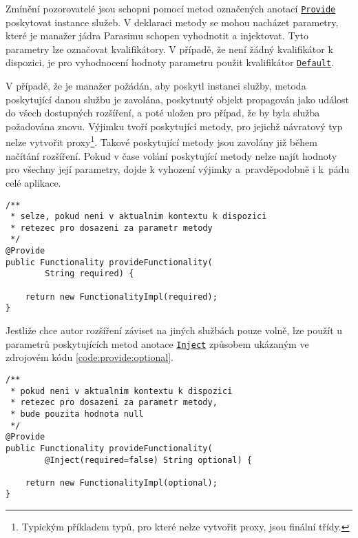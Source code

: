 Zmínění pozorovatelé jsou schopni pomocí metod označených anotací \href{https://github.com/sybila/parasim/blob/2.0.0.Final/core/src/main/java/org/sybila/parasim/core/annotation/Provide.java}{\texttt{Provide}}
poskytovat instance služeb. V deklaraci metody se mohou na\-chá\-zet parametry,
které je manažer jádra Parasimu schopen vyhodnotit a injektovat. Tyto parametry
lze označovat kvalifikátory. V případě, že není žádný kvalifikátor k dispozici,
je pro vyhodnocení hodnoty parametru použit kvalifikátor \href{https://github.com/sybila/parasim/blob/2.0.0.Final/core/src/main/java/org/sybila/parasim/core/annotation/Default.java}{\texttt{Default}}.

V případě, že je manažer požádán, aby poskytl instanci služby, metoda poskytující danou službu je zavolána,
poskytnutý objekt propagován jako událost do všech dostupných rozšíření, a poté uložen pro případ,
že by byla služba požadována znovu. Výjimku tvoří poskytující metody, pro jejichž
návratový typ nelze vytvořit proxy\footnote{Typickým příkladem typů, pro které nelze vytvořit proxy, jsou finální třídy.}.
Takové poskytující metody jsou zavolány již během načítání rozšíření. Pokud v čase volání
poskytující metody nelze najít hodnoty pro všechny její parametry, dojde k vyhození výjimky a~prav\-dě\-po\-dob\-ně i k~pádu celé aplikace.

\begin{lstlisting}[label={code:provide:required}, caption={První metoda poskytující službu \texttt{Functionality}}, style=Java]
/**
 * selze, pokud neni v aktualnim kontextu k dispozici 
 * retezec pro dosazeni za parametr metody
 */
@Provide
public Functionality provideFunctionality(
		String required) {

	return new FunctionalityImpl(required);
}
\end{lstlisting}

Jestliže chce autor rozšíření záviset na jiných službách pouze volně, lze použít 
u parametrů poskytujících metod anotace \href{https://github.com/sybila/parasim/blob/2.0.0.Final/core/src/main/java/org/sybila/parasim/core/annotation/Inject.java}{\texttt{Inject}} způsobem u\-ká\-za\-ným ve zdrojovém
kódu \ref{code:provide:optional}.

\begin{lstlisting}[label={code:provide:optional}, caption={Druhá metoda poskytující službu \texttt{Functionality}}, style=Java]
/**
 * pokud neni v aktualnim kontextu k dispozici 
 * retezec pro dosazeni za parametr metody,
 * bude pouzita hodnota null
 */
@Provide
public Functionality provideFunctionality(
		@Inject(required=false) String optional) {

	return new FunctionalityImpl(optional);
}
\end{lstlisting}

